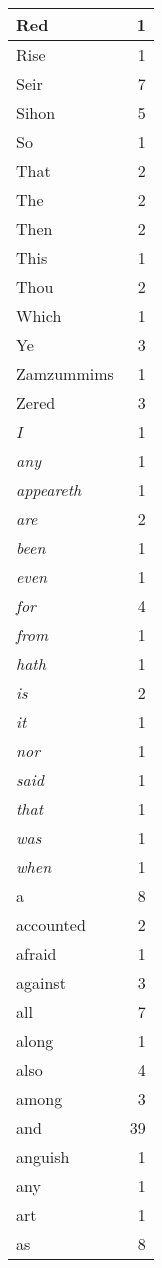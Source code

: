 \begin{center}
\begin{longtable}{l|r}
Red & 1 \\ \hline
Rise & 1 \\ \hline
Seir & 7 \\ \hline
Sihon & 5 \\ \hline
So & 1 \\ \hline
That & 2 \\ \hline
The & 2 \\ \hline
Then & 2 \\ \hline
This & 1 \\ \hline
Thou & 2 \\ \hline
Which & 1 \\ \hline
Ye & 3 \\ \hline
Zamzummims & 1 \\ \hline
Zered & 3 \\ \hline
\emph{I} & 1 \\ \hline
\emph{any} & 1 \\ \hline
\emph{appeareth} & 1 \\ \hline
\emph{are} & 2 \\ \hline
\emph{been} & 1 \\ \hline
\emph{even} & 1 \\ \hline
\emph{for} & 4 \\ \hline
\emph{from} & 1 \\ \hline
\emph{hath} & 1 \\ \hline
\emph{is} & 2 \\ \hline
\emph{it} & 1 \\ \hline
\emph{nor} & 1 \\ \hline
\emph{said} & 1 \\ \hline
\emph{that} & 1 \\ \hline
\emph{was} & 1 \\ \hline
\emph{when} & 1 \\ \hline
a & 8 \\ \hline
accounted & 2 \\ \hline
afraid & 1 \\ \hline
against & 3 \\ \hline
all & 7 \\ \hline
along & 1 \\ \hline
also & 4 \\ \hline
among & 3 \\ \hline
and & 39 \\ \hline
anguish & 1 \\ \hline
any & 1 \\ \hline
art & 1 \\ \hline
as & 8 \\ \hline

\end{longtable}
\end{center}
